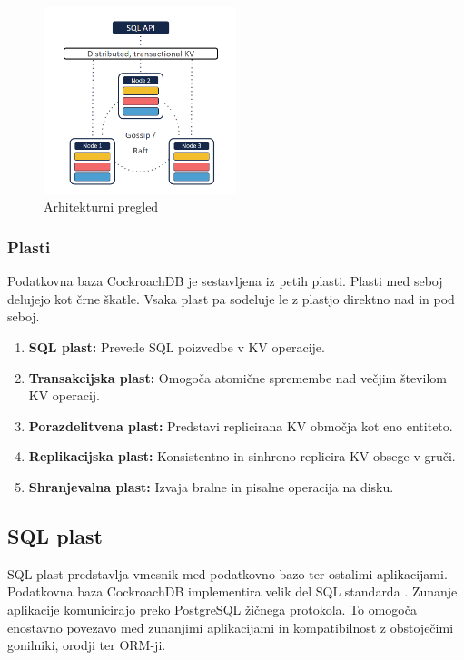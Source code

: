 \documentclass[a4paper, 12pt]{book}
\begin{document}
\begin{figure}[H]
\begin{center}
\includegraphics[width=0.5\textwidth]{resources/crdb-arhitecture-overview.png}
\end{center}
\caption{Arhitekturni pregled \cite{CRDB-2017}}
\label{img_crdb_arhitecture_overview}
\end{figure}

\subsubsection{Plasti}
Podatkovna baza CockroachDB je sestavljena iz petih plasti. Plasti med seboj delujejo kot črne škatle. Vsaka plast pa sodeluje le z plastjo direktno nad in pod seboj.

\begin{enumerate}
    \item \textbf{SQL plast:} Prevede SQL poizvedbe v KV operacije.
    \item \textbf{Transakcijska plast:} Omogoča atomične spremembe nad večjim šte\-vi\-lom KV operacij.
    \item \textbf{Porazdelitvena plast:} Predstavi replicirana KV območja kot eno entiteto.
    \item \textbf{Replikacijska plast:} Konsistentno in sinhrono replicira KV obsege v gruči.
    \item \textbf{Shranjevalna plast:} Izvaja bralne in pisalne operacija na disku.
\end{enumerate}

\subsection{SQL plast}

SQL plast predstavlja vmesnik med podatkovno bazo ter ostalimi aplikacijami.  Podatkovna baza CockroachDB implementira velik del SQL standarda \cite{CRDB-sql-standard}. Zunanje aplikacije komunicirajo preko PostgreSQL žičnega protokola. To omogoča enostavno povezavo med zunanjimi aplikacijami in kompatibilnost z obstoječimi gonilniki, orodji ter ORM-ji.
\end{document}
